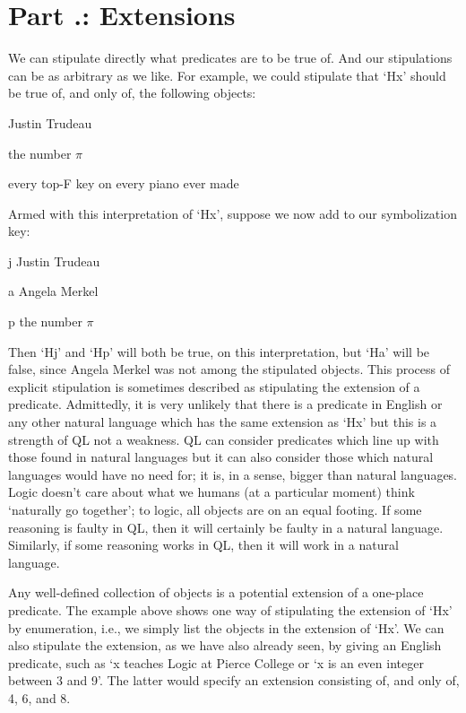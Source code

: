 \section{Part \thechapcount.\theseccount: Extensions}
We can stipulate directly what predicates are to be true of. And our stipulations can be as arbitrary as we like. For example, we could stipulate that ‘Hx’ should be true of, and only of, the following objects:
\begin{earg}
\item[]Justin Trudeau
\item[]the number $\pi$
\item[]every top-F key on every piano ever made
\end{earg}
Armed with this interpretation of ‘Hx’, suppose we now add to our symbolization key:
\begin{ekey}
\item[j] Justin Trudeau
\item[a] Angela Merkel
\item[p] the number $\pi$
\end{ekey}
Then ‘Hj’ and ‘Hp’ will both be true, on this interpretation, but ‘Ha’ will be false, since Angela Merkel was not among the stipulated objects. This process of explicit stipulation is sometimes described as stipulating the extension of a predicate. Admittedly, it is very unlikely that there is a predicate in English or any other natural language which has the same extension as ‘Hx' but this is a strength of QL not a weakness. QL can consider predicates which line up with those found in natural languages but it can also consider those which natural languages would have no need for; it is, in a sense, bigger than natural languages. Logic doesn’t care about what we humans (at a particular moment) think ‘naturally go together’; to logic, all objects are on an equal footing. If some reasoning is faulty in QL, then it will certainly be faulty in a natural language. Similarly, if some reasoning works in QL, then it will work in a natural language. 

Any well-defined collection of objects is a potential extension of a one-place predicate. The example above shows one way of stipulating the extension of ‘Hx’ by enumeration, i.e., we simply list the objects in the extension of ‘Hx’. We can also stipulate the extension, as we have also already seen, by giving an English predicate, such as ‘x teaches Logic at Pierce College or ‘x is an even integer between 3 and 9’. The latter would specify an extension consisting of, and only of, 4, 6, and 8.

